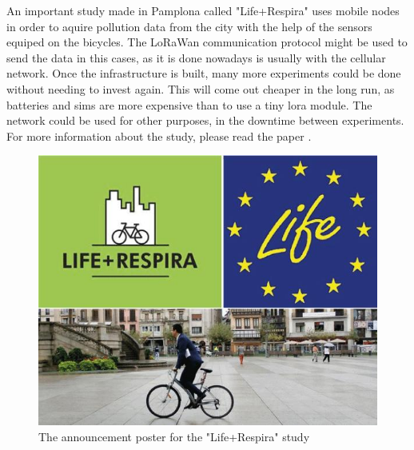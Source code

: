 \label{sec:sa-temp}

An important study made in Pamplona called "Life+Respira" uses mobile nodes in order to aquire pollution data from the 
city with the help of the sensors equiped on the bicycles. The LoRaWan communication protocol might be used to
send the data in this cases, as it is done nowadays is usually with the cellular network. Once the infrastructure is
built, many more experiments could be done without needing to invest again. This will come out cheaper in the long 
run, as batteries and sims are more expensive than to use a tiny lora module. The network could be used for other 
purposes, in the downtime between experiments. For more information about the study, please read the paper \cite{elola2018life+}.


\begin{figure}[htpb]
    \centering    
    \includegraphics[width=\linewidth]{ lifeRespira.png}
    \caption{The announcement poster for the "Life+Respira" study}
    \label{chap:second:fig:1}
\end{figure}